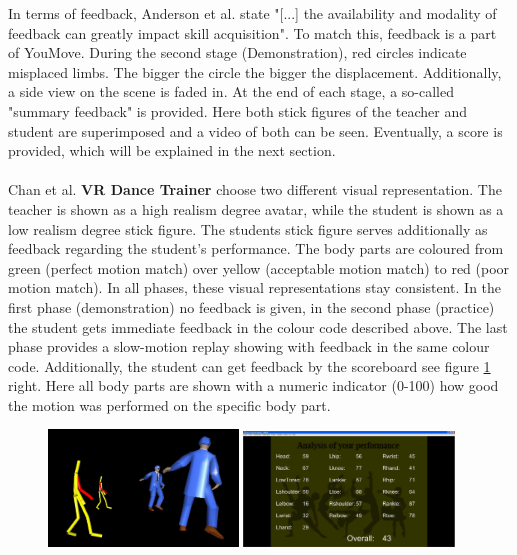 In terms of feedback, Anderson et al. state "[...] the availability and modality of feedback can greatly impact skill acquisition". To match this, feedback is a part of YouMove. During the second stage (Demonstration), red circles indicate misplaced limbs. The bigger the circle the bigger the displacement. Additionally, a side view on the scene is faded in. At the end of each stage, a so-called "summary feedback" is provided. Here both stick figures of the teacher and student are superimposed and a video of both can be seen. Eventually, a score is provided, which will be explained in the next section.\\ \\
Chan et al. \textbf{VR Dance Trainer}\cite{Chan2010} choose two different visual representation. The teacher is shown as a high realism degree avatar, while the student is shown as a low realism degree stick figure. The students stick figure serves additionally as feedback regarding the student's performance. The body parts are coloured from green (perfect motion match) over yellow (acceptable motion match) to red (poor motion match). In all phases, these visual representations stay consistent. In the first phase (demonstration) no feedback is given, in the second phase (practice) the student gets immediate feedback in the colour code described above. The last phase provides a slow-motion replay showing with feedback in the same colour code. Additionally, the student can get feedback by the scoreboard see figure \ref{fig:vrdt} right. Here all body parts are shown with a numeric indicator (0-100) how good the motion was performed on the specific body part.
\begin{figure}
	\centering
	\includegraphics[width=0.45\textwidth]{img/VRDanceTrainerPractice.png}
	\includegraphics[width=0.5\textwidth]{img/VRDanceTrainerScoreBoard.png}
	\caption{\todo \cite{Chan2010}}
	\label{fig:vrdt}
\end{figure}
